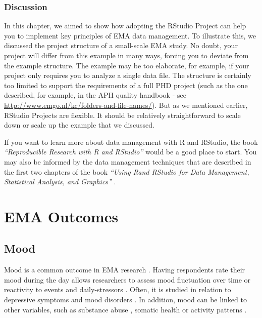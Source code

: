 \documentclass[]{book}
\begin{document}
\section{Discussion}\label{discussion}

In this chapter, we aimed to show how adopting the RStudio Project can
help you to implement key principles of EMA data management. To
illustrate this, we discussed the project structure of a small-scale EMA
study. No doubt, your project will differ from this example in many
ways, forcing you to deviate from the example structure. The example may
be too elaborate, for example, if your project only requires you to
analyze a single data file. The structure is certainly too limited to
support the requirements of a full PHD project (such as the one
described, for example, in the APH quality handbook - see
\url{http://www.emgo.nl/kc/folders-and-file-names/}). But as we
mentioned earlier, RStudio Projects are flexible. It should be
relatively straightforward to scale down or scale up the example that we
discussed.

If you want to learn more about data management with R and RStudio, the
book \emph{``Reproducible Research with R and RStudio''}
\citep{gandrud2015} would be a good place to start. You may also be
informed by the data management techniques that are described in the
first two chapters of the book \emph{``Using Rand RStudio for Data
Management, Statistical Analysis, and Graphics''} \citep{horton2015}.

\part{EMA Outcomes}\label{part-ema-outcomes}

\chapter{Mood}\label{mood}

 


Mood is a common outcome in EMA research
\citep{Myin-Germeys2016, Desmet2016}. Having respondents rate their mood
during the day allows researchers to assess mood fluctuation over time
or reactivity to events and daily-stressors \citep{Wenze2010}. Often, it
is studied in relation to depressive symptoms and mood disorders
\citep{AanhetRot2012}. In addition, mood can be linked to other
variables, such as substance abuse \citep{Kirchner2013, Serre2015},
somatic health \citep{Engel2016, Moore2016} or activity patterns
\citep{Dunton2017, Marszalek2014}.
\end{document}
